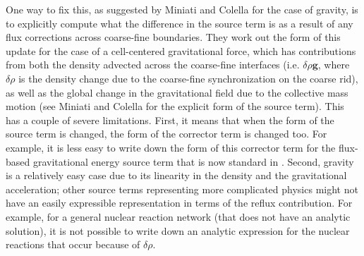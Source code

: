 One way to fix this, as suggested by Miniati and Colella for the case
of gravity, is to explicitly compute what the difference in the source
term is as a result of any flux corrections across coarse-fine
boundaries. They work out the form of this update for the case of a
cell-centered gravitational force, which has contributions from both
the density advected across the coarse-fine interfaces
(i.e. $\delta \rho \mathbf{g}$, where $\delta \rho$ is the density
change due to the coarse-fine synchronization on the coarse rid), as
well as the global change in the gravitational field due to the
collective mass motion (see Miniati and Colella for the explicit form
of the source term). This has a couple of severe limitations. First,
it means that when the form of the source term is changed, the form of
the corrector term is changed too. For example, it is less easy to
write down the form of this corrector term for the flux-based
gravitational energy source term that is now standard in \castro.
Second, gravity is a relatively easy case due to its linearity in the
density and the gravitational acceleration; other source terms
representing more complicated physics might not have an easily
expressible representation in terms of the reflux contribution. For
example, for a general nuclear reaction network (that does not have an
analytic solution), it is not possible to write down an analytic
expression for the nuclear reactions that occur because of
$\delta \rho$.

